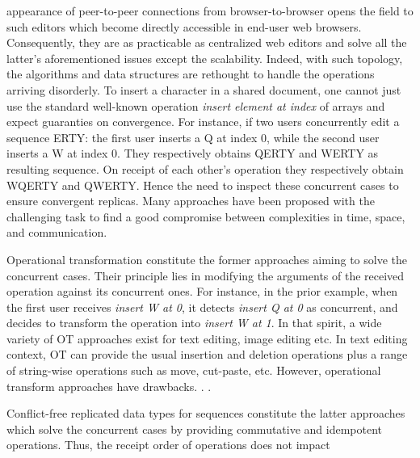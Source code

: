 \begin{asparadesc}
  appearance of peer-to-peer connections from browser-to-browser opens the field
  to such editors which become directly accessible in end-user web
  browsers. Consequently, they are as practicable as centralized web editors and
  solve all the latter's aforementioned issues except the scalability. Indeed,
  with such topology, the algorithms and data structures are rethought to handle
  the operations arriving disorderly.  To insert a character in a shared
  document, one cannot just use the standard well-known operation \emph{insert
    element at index} of arrays and expect guaranties on convergence. For
  instance, if two users concurrently edit a sequence ERTY: the first user
  inserts a Q at index 0, while the second user inserts a W at index 0. They
  respectively obtains QERTY and WERTY as resulting sequence. On receipt of each
  other's operation they respectively obtain WQERTY and QWERTY. Hence the need
  to inspect these concurrent cases to ensure convergent replicas.  Many
  approaches have been proposed with the challenging task to find a good
  compromise between complexities in time, space, and communication.
\item [Operational transformation] constitute the former approaches aiming to
  solve the concurrent cases. Their principle lies in modifying the arguments of
  the received operation against its concurrent ones. For instance, in the prior
  example, when the first user receives \emph{insert W at 0}, it detects
  \emph{insert Q at 0} as concurrent, and decides to transform the operation
  into \emph{insert W at 1}.  In that spirit, a wide variety of OT approaches
  exist for text editing, image editing etc. In text editing context, OT can
  provide the usual insertion and deletion operations plus a range of
  string-wise operations such as move, cut-paste, etc. However, operational
  transform approaches have drawbacks. . .
\item [Conflict-free replicated data types] for sequences constitute the latter
  approaches which solve the concurrent cases by providing commutative and
  idempotent operations. Thus, the receipt order of operations does not impact

\end{asparadesc}
